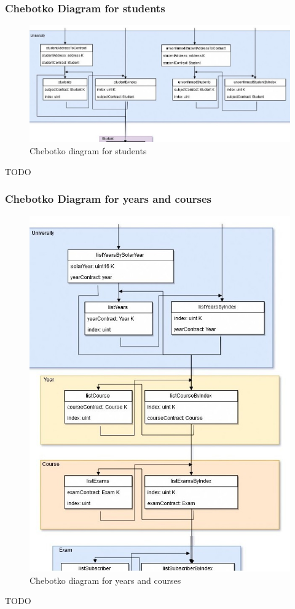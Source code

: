 \documentclass[ManualeSviluppatore]{subfiles}
\begin{document}
\subsubsection{Chebotko Diagram for students}
\begin{figure}[H]
	\centering
	\includegraphics[width=1\linewidth]{"diagrammi/chebotko/student"}
	\caption{Chebotko diagram for students}
	\label{fig:Chebotko diagram for students}
\end{figure}
TODO

\subsubsection{Chebotko Diagram for years and courses}
\begin{figure}[H]
	\centering
	\includegraphics[width=0.9\linewidth]{"diagrammi/chebotko/year_course"}
	\caption{Chebotko diagram for years and courses}
	\label{fig:Chebotko diagram for years and courses}
\end{figure}
TODO
\end{document}
